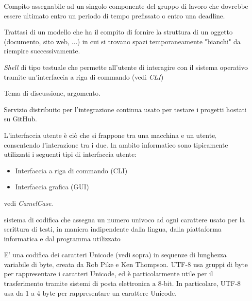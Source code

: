 \documentclass{scalatekids-article}
\begin{document}

   Compito assegnabile ad un singolo componente del gruppo di lavoro che dovrebbe essere ultimato entro un periodo di tempo prefissato o entro una deadline. %

   Trattasi di un modello che ha il compito di fornire la struttura di un oggetto (documento, sito web, ...) in cui si trovano spazi temporaneamente "bianchi" da riempire successivamente.

   \textit{Shell} di tipo testuale che permette all'utente di interagire con il sistema operativo tramite un'interfaccia a riga di commando (vedi \textit{CLI})

   Tema di discussione, argomento.

   Servizio distribuito per l'integrazione continua usato per testare i progetti hostati su GitHub.


   L'interfaccia utente è ciò che si frappone tra una macchina e un utente, consentendo l'interazione tra i due. In ambito informatico sono tipicamente utilizzati i seguenti tipi di interfaccia utente:


  \begin{itemize}
  \item Interfaccia a riga di commando (CLI)
  \item Interfaccia grafica (GUI)
  \end{itemize}

   vedi \textit{CamelCase}.

   sistema di codifica che assegna un numero univoco ad ogni carattere usato per la scrittura di testi, in maniera indipendente dalla lingua, dalla piattaforma informatica e dal programma utilizzato

   E' una codifica dei caratteri Unicode (vedi sopra) in sequenze di lunghezza variabile di byte, creata da Rob Pike e Ken Thompson. UTF-8 usa gruppi di byte per rappresentare i caratteri Unicode, ed è particolarmente utile per il trasferimento tramite sistemi di posta elettronica a 8-bit.
  In particolare, UTF-8 usa da 1 a 4 byte per rappresentare un carattere Unicode.

\end{document}
